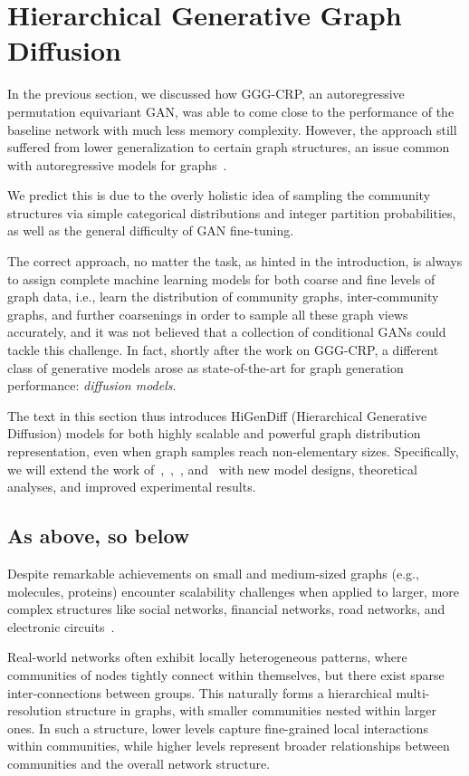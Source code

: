 \section{Hierarchical Generative Graph Diffusion}
\label{sec: higendiff}

In the previous section, we discussed how GGG-CRP, an autoregressive permutation equivariant GAN, was able to come close to the performance of the baseline network with much less memory complexity. However, the approach still suffered from lower generalization to certain graph structures, an issue common with autoregressive models for graphs~\cite{krawczuk_gg-gan_2020}. 

We predict this is due to the overly holistic idea of sampling the community structures via simple categorical distributions and integer partition probabilities, as well as the general difficulty of GAN fine-tuning. 

The correct approach, no matter the task, as hinted in the introduction, is always to assign complete machine learning models for both coarse and fine levels of graph data, i.e., learn the distribution of community graphs, inter-community graphs, and further coarsenings in order to sample all these graph views accurately, and it was not believed that a collection of conditional GANs could tackle this challenge. In fact, shortly after the work on GGG-CRP, a different class of generative models arose as state-of-the-art for graph generation performance: \emph{diffusion models}. 

The text in this section thus introduces HiGenDiff (Hierarchical Generative Diffusion) models for both highly scalable and powerful graph distribution representation, even when graph samples reach non-elementary sizes. Specifically, we will extend the work of~\cite{vignac_digress_2022},~\cite{karami_higen_2024},~\cite{karami_multi-resolution_2024}, and~\cite{krawczuk_graph_2024} with new model designs, theoretical analyses, and improved experimental results.

\subsection{As above, so below}
Despite remarkable achievements on small and medium-sized graphs (e.g., molecules, proteins) encounter scalability challenges when applied to larger, more complex structures like social networks, financial networks, road networks, and electronic circuits~\cite{krawczuk_graph_2024}. 

Real-world networks often exhibit locally heterogeneous patterns, where communities of nodes tightly connect within themselves, but there exist sparse inter-connections between groups.
This naturally forms a hierarchical multi-resolution structure in graphs, with smaller communities nested within larger ones. In such a structure, lower levels capture fine-grained local interactions within communities, while higher levels represent broader relationships between communities and
the overall network structure. 


